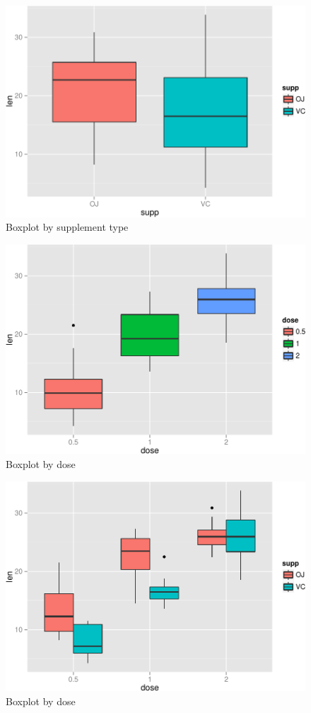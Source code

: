 \documentclass[]{article}
\begin{document}
\begin{figure}

{\centering \includegraphics[width=.7\textwidth]{Tooth_Growth_Inferential_Data_Analysis_files/figure-latex/bp_by_supp-1} 

}

\caption{Boxplot by supplement type}\label{fig:bp_by_supp}
\end{figure}

\begin{figure}

{\centering \includegraphics[width=.7\textwidth]{Tooth_Growth_Inferential_Data_Analysis_files/figure-latex/bp_by_dose-1} 

}

\caption{Boxplot by dose}\label{fig:bp_by_dose}
\end{figure}

\begin{figure}

{\centering \includegraphics[width=.7\textwidth]{Tooth_Growth_Inferential_Data_Analysis_files/figure-latex/bp_by_dose_and_supp-1} 

}

\caption{Boxplot by dose}\label{fig:bp_by_dose_and_supp}
\end{figure}
\end{document}
